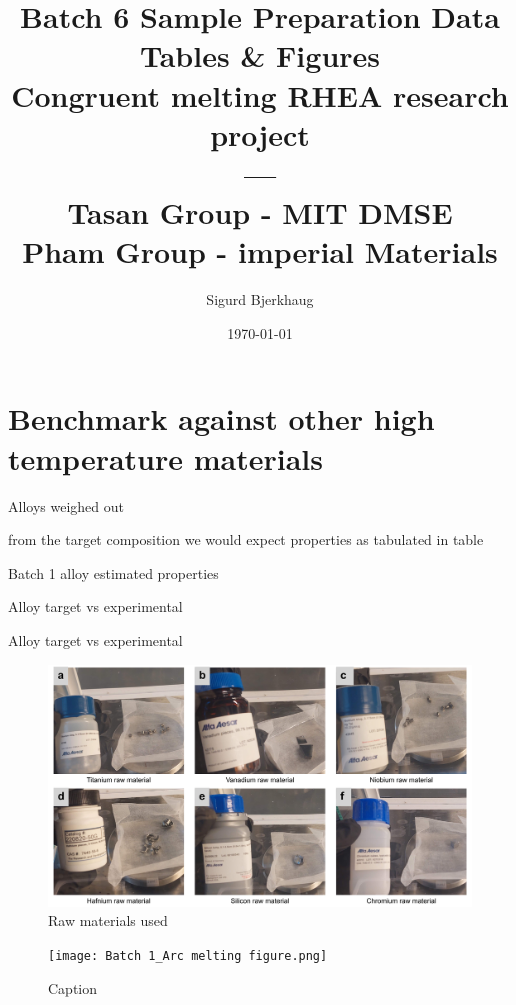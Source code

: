 \documentclass[a4]{article}
\title{Batch 6 Sample Preparation Data Tables \& Figures \\ Congruent melting RHEA research project \\ ---\\Tasan Group - MIT DMSE \\ Pham Group - imperial Materials \\}
\author{Sigurd Bjerkhaug}
\date{\today}
\begin{document}
\maketitle

\newpage




\section{Benchmark against other high temperature materials}

\begin{table}[h]
    \centering
    \caption{Alloys weighed out}
    
    \label{tab:Batch1 mesured}
\end{table}

from the target composition we would expect properties as tabulated in table
\begin{table}[h]
    \centering
    \caption{Batch 1 alloy estimated properties}
    
    \label{tab:Batch1 mesured}
\end{table}

\begin{table}[h]
    \centering
    \caption{Alloy target vs experimental}
    
    \label{tab:Batch1 mesured}
\end{table}

\begin{table}[h]
    \centering
    \caption{Alloy target vs experimental}
    
    \label{tab:Batch1 mesured}
\end{table}

\begin{figure}
    \centering
    \includegraphics{batch 1 raw materials.jpg}
    \caption{Raw materials used}
    \label{fig:raw-material info}
\end{figure}

\begin{figure}
    \centering
    \texttt{[image: Batch 1\_Arc melting figure.png]}
    \caption{Caption}
    \label{fig:arc-melted samples}
\end{figure}
\end{document}
